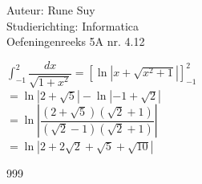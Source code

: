 \documentclass[a4paper]{article}
\newcommand{\Int}{\displaystyle\int}
\begin{document}
  
\noindent \large Auteur: Rune Suy \\
\noindent \large Studierichting: Informatica\\
\noindent \large Oefeningenreeks 5A nr. 4.12\\

\medskip

\normalsize

$\Int_{-1}^2 \dfrac{dx}{\sqrt{1+x^2}} = \left[\ln\left|x+\sqrt{x^2 + 1}\right|\right]_{-1}^2$\\

$=\ln\left|2+\sqrt{5}\right| - \ln\left|-1+\sqrt{2}\right|$\\

$=\ln\left| \dfrac{(2+\sqrt{5})(\sqrt{2}+1)}{(\sqrt{2}-1)(\sqrt{2}+1)} \right|$\\

$=\ln\left| 2+2\sqrt{2}+\sqrt{5}+\sqrt{10} \right|$\\

\begin{thebibliography}{999}
\end{thebibliography}
\end{document}
